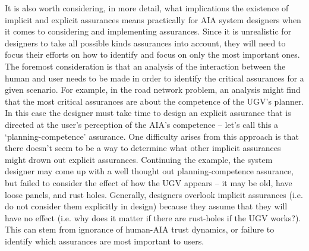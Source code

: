 It is also worth considering, in more detail, what implications the existence of implicit and explicit assurances means practically for AIA system designers when it comes to considering and implementing assurances. 
Since it is unrealistic for designers to take all possible kinds assurances into account, they will need to focus their efforts on how to identify and focus on only the most important ones. 
The foremost consideration is that an analysis of the interaction between the human and user needs to be made in order to identify the critical assurances for a given scenario. 
For example, in the road network problem, an analysis might find that the most critical assurances are about the competence of the UGV's planner. 
In this case the designer must take time to design an explicit assurance that is directed at the user's perception of the AIA's competence -- let's call this a `planning-competence' assurance. 
One difficulty arises from this approach is that there doesn't seem to be a way to determine what other implicit assurances might drown out explicit assurances. 
Continuing the example, the system designer may come up with a well thought out planning-competence assurance, but failed to consider the effect of how the UGV appears -- it may be old, have loose panels, and rust holes. Generally, designers overlook implicit assurances (i.e. do not consider them explicitly in design) because they assume that they will have no effect (i.e. why does it matter if there are rust-holes if the UGV works?). This can stem from ignorance of human-AIA trust dynamics, or failure to identify which assurances are most important to users.
%

